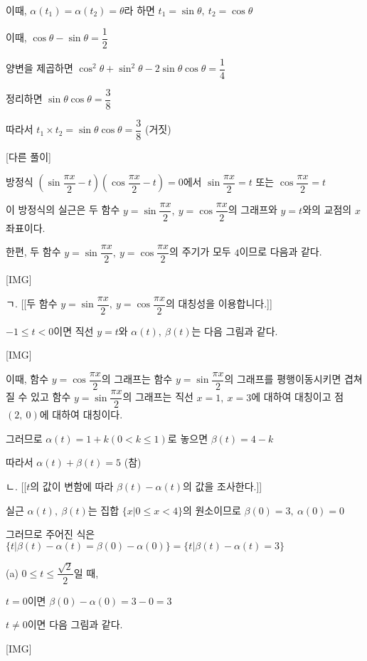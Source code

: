 \documentclass{oblivoir}
\begin{document}
이때, $\alpha\left(t_{1}\right)=\alpha\left(t_{2}\right)=\theta$라 하면 $t_{1}=\sin\theta ,\:t_{2}=\cos \theta$

이때, $\cos\theta -\sin\theta =\dfrac{1}{2}$

양변을 제곱하면 $\cos^{2}\theta +\sin^{2}\theta -2\sin\theta \cos\theta =\dfrac{1}{4}$

정리하면 $\sin\theta\cos\theta =\dfrac{3}{8}$

따라서 $t_{1}\times t_{2}=\sin\theta\cos\theta =\dfrac{3}{8}$  (거짓)




[다른 풀이]

방정식 $\left(\sin\dfrac{\pi x}{2}-t\right)\left(\cos\dfrac{\pi x}{2}-t\right)=0$에서 $\sin\dfrac{\pi x}{2}=t$ 또는 $\cos\dfrac{\pi x}{2}=t$

이 방정식의 실근은 두 함수 $y=\sin\dfrac{\pi x}{2},\:y=\cos\dfrac{\pi x}{2}$의 그래프와 $y=t$와의 교점의 $x$좌표이다.

한편, 두 함수 $y=\sin\dfrac{\pi x}{2},\:y=\cos\dfrac{\pi x}{2}$의 주기가 모두 $4$이므로 다음과 같다.

[IMG]

ㄱ.  [[두 함수 $y=\sin\dfrac{\pi x}{2},\:y=\cos\dfrac{\pi x}{2}$의 대칭성을 이용합니다.]]

$-1\le t< 0$이면 직선 $y=t$와 $\alpha(t),\:\beta(t)$는 다음 그림과 같다.

[IMG]

이때, 함수 $y=\cos\dfrac{\pi x}{2}$의 그래프는 함수 $y=\sin\dfrac{\pi x}{2}$의 그래프를 평행이동시키면 겹쳐질 수 있고 함수 $y=\sin\dfrac{\pi x}{2}$의 그래프는 직선 $x=1,\:x=3$에 대하여 대칭이고 점 $(2,\:0)$에 대하여 대칭이다.

그러므로 $\alpha(t)=1+k(0< k\le 1)$로 놓으면 $\beta(t)=4-k$

따라서 $\alpha(t)+\beta(t)=5$ (참)

ㄴ. [[$t$의 값이 변함에 따라 $\beta(t)-\alpha(t)$의 값을 조사한다.]]

실근 $\alpha(t),\:\beta(t)$는 집합 $\{x\vert  0\le x< 4\}$의 원소이므로 $\beta(0)=3,\:\alpha(0)=0$

그러므로 주어진 식은 $\{t\vert \beta(t)-\alpha(t)=\beta(0)-\alpha(0)\}=\{t\vert \beta(t)-\alpha(t)=3\}$

(a) $0\le t\le\dfrac{\sqrt{2}}{2}$일 때,

$t=0$이면 $\beta(0)-\alpha(0)=3-0=3$

$t\ne 0$이면 다음 그림과 같다.

[IMG]
\end{document}
